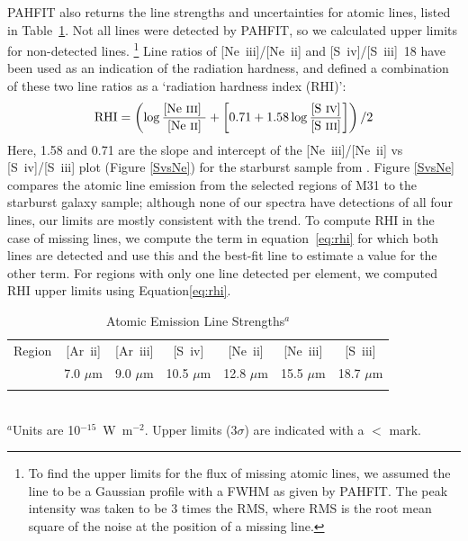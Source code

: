 PAHFIT also returns the line strengths and uncertainties for atomic lines, listed in Table~\ref{Atomic}.
Not all lines were detected by PAHFIT, so we calculated upper limits for non-detected lines.%
\footnote{To find  the upper limits for the flux of missing atomic lines, we assumed the line to be a 
Gaussian profile with a FWHM as given by PAHFIT. The peak intensity was taken to be 3 times the RMS, where RMS is the root mean square of 
the noise at the position of a missing line.}
Line ratios of [Ne~{\sc iii}]/[Ne~{\sc ii}] and [S~{\sc iv}]/[S~{\sc iii}]~18 have been used as an indication of the radiation hardness, and
\citet{Engelbracht_2008} defined a combination of these two line ratios as a `radiation hardness index (RHI)':
\begin{equation}
{\rm RHI} = \left( \log\frac{\textrm{[Ne~{\sc iii}] }}{\textrm{[Ne~{\sc ii}]}} + \left[0.71 + 1.58\log\frac{\textrm{{[S~{\sc iv}]}}}{\textrm{{[S~{\sc iii}]}}}\right]\right) /2
\end{equation}
\label{eq:rhi}
Here, 1.58 and 0.71 are the slope and intercept of the [Ne~{\sc iii}]/[Ne~{\sc ii}]  vs [S~{\sc iv}]/[S~{\sc iii}] plot (Figure \ref{SvsNe}) for the starburst sample from 
\citet{Engelbracht_2008}. 
Figure \ref{SvsNe}  compares the atomic line emission from the selected regions of M31 to the starburst galaxy sample;
although none of our spectra have detections of all four lines, our limits are mostly consistent with the trend.
To compute RHI in the case of missing lines, we compute the term in equation~\ref{eq:rhi} 
for which both lines are detected and use this and the best-fit line to estimate a value for the other term.
For regions with only one line detected per element, we computed RHI upper limits 
using Equation\ref{eq:rhi}.


\begin{table}
 \centering
 \begin{minipage}{100mm}
\caption{Atomic Emission Line Strengths$^a$}
  \begin{tabular}{l c c  c  c  c  c  }
  \hline
  {Region  }&{[Ar~{\sc ii}] }&{[Ar~{\sc iii}]  }&{[S~{\sc iv}]}&{[Ne~{\sc ii}]   }&{[Ne~{\sc iii}]   }&{[S~{\sc iii}]  }\\
{}&{\tiny{7.0 $\mu$m} }&{\tiny{9.0 $\mu$m }}&{\tiny{10.5 $\mu$m}}&{\tiny{12.8 $\mu$m  }}&{\tiny{15.5 $\mu$m } }&{\tiny{18.7 $\mu$m }} \\
 \hline 
  
\hline
 \label{Atomic}
\end{tabular}\\
{ $^a$Units are 10$^{-15}$~W~m$^{-2}$. Upper limits ($3\sigma$) are indicated with a $<$ mark.  }
\end{minipage}
\end{table}

